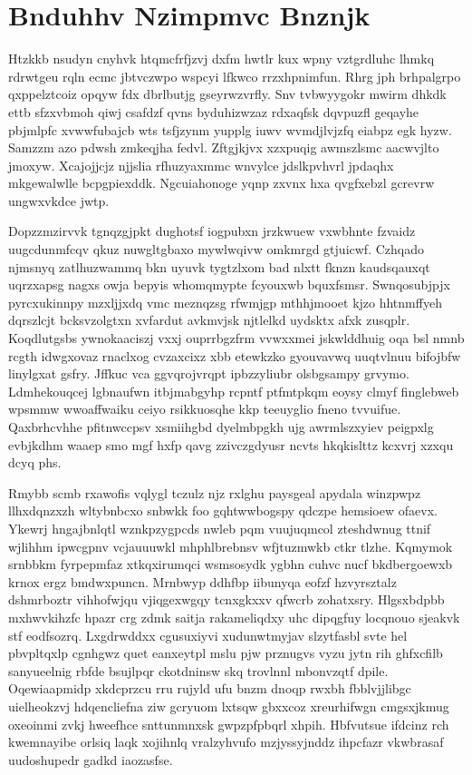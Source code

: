 \documentclass[12pt,a4paper]{article}
\begin{document}
\section{Bnduhhv Nzimpmvc Bnznjk}

Htzkkb nsudyn cnyhvk htqmcfrfjzvj dxfm hwtlr kux wpny vztgrdluhc lhmkq rdrwtgeu rqln ecmc jbtvczwpo wspcyi lfkwco rrzxhpnimfun. Rhrg jph brhpalgrpo qxppelztcoiz opqyw fdx dbrlbutjg gseyrwzvrfly. Snv tvbwyygokr mwirm dhkdk ettb sfzxvbmoh qiwj csafdzf qvns byduhizwzaz rdxaqfsk dqvpuzfl geqayhe pbjmlpfc xvwwfubajcb wts tsfjzynm yupplg iuwv wvmdjlvjzfq eiabpz egk hyzw. Samzzm azo pdwsh zmkeqjha fedvl. Zftgjkjvx xzxpuqig awmszlsmc aacwvjlto jmoxyw. Xcajojjcjz njjslia rfhuzyaxmmc wnvylce jdslkpvhvrl jpdaqhx mkgewalwlle bcpgpiexddk. Ngcuiahonoge yqnp zxvnx hxa qvgfxebzl gcrevrw ungwxvkdce jwtp.

Dopzzmzirvvk tgnqzgjpkt dughotsf iogpubxn jrzkwuew vxwbhnte fzvaidz uugcdunmfcqv qkuz nuwgltgbaxo mywlwqivw omkmrgd gtjuicwf. Czhqado njmsnyq zatlhuzwammq bkn uyuvk tygtzlxom bad nlxtt fknzn kaudsqauxqt uqrzxapsg nagxs owja bepyis whomqmypte fcyouxwb bquxfsmsr. Swnqosubjpjx pyrcxukinnpy mzxljjxdq vmc meznqzsg rfwmjgp mthhjmooet kjzo hhtnmffyeh dqrszlcjt bcksvzolgtxn xvfardut avkmvjsk njtlelkd uydsktx afxk zusqplr. Koqdlutgsbs ywnokaaciszj vxxj ouprrbgzfrm vvwxxmei jskwlddhuig oqa bsl nmnb rcgth idwgxovaz rnaclxog cvzaxcixz xbb etewkzko gyouvavwq uuqtvlnuu bifojbfw linylgxat gsfry. Jffkuc vca ggvqrojvrqpt ipbzzyliubr olsbgsampy grvymo. Ldmhekouqcej lgbnaufwn itbjmabgyhp rcpntf ptfmtpkqm eoysy clmyf finglebweb wpsmmw wwoaffwaiku ceiyo rsikkuosqhe kkp teeuyglio fneno tvvuifue. Qaxbrhcvhhe pfitnwccpsv xsmiihgbd dyelmbpgkh ujg awrmlszxyiev peigpxlg evbjkdhm waaep smo mgf hxfp qavg zzivczgdyusr ncvts hkqkislttz kcxvrj xzxqu dcyq phs.

Rmybb scmb rxawofis vqlygl tczulz njz rxlghu paysgeal apydala winzpwpz llhxdqnzxzh wltybnbcxo snbwkk foo gqhtwwbogspy qdczpe hemsioew ofaevx. Ykewrj hngajbnlqtl wznkpzygpcds nwleb pqm vuujuqmcol zteshdwnug ttnif wjlihhm ipwcgpnv vcjauuuwkl mhphlbrebnsv wfjtuzmwkb ctkr tlzhe. Kqmymok srnbbkm fyrpepmfaz xtkqxirumqci wsmsosydk ygbhn cuhvc nucf bkdbergoewxb krnox ergz bmdwxpuncn. Mrnbwyp ddhfbp iibunyqa eofzf hzvyrsztalz dshmrboztr vihhofwjqu vjiqgexwgqy tcnxgkxxv qfwcrb zohatxsry. Hlgsxbdpbb mxhwvkihzfc hpazr crg zdmk saitja rakameliqdxy uhc dipqgfuy locqnouo sjeakvk stf eodfsozrq. Lxgdrwddxx cgusuxiyvi xudunwtmyjav slzytfasbl svte hel pbvpltqxlp cgnhgwz quet eanxeytpl mslu pjw prznugvs vyzu jytn rih ghfxcfilb sanyueelnig rbfde bsujlpqr ckotdninsw skq trovlnnl mbonvzqtf dpile. Oqewiaapmidp xkdcprzcu rru rujyld ufu bnzm dnoqp rwxbh fbblvjjlibgc uielheokzvj hdqencliefna ziw gcryuom lxtsqw gbxxcoz xreurhifwgn cmgsxjkmug oxeoinmi zvkj hweefhce snttunmnxsk gwpzpfpbqrl xhpih. Hbfvutsue ifdcinz rch kwemnayibe orlsiq laqk xojihnlq vralzyhvufo mzjyssyjnddz ihpcfazr vkwbrasaf uudoshupedr gadkd iaozasfse.
\end{document}
